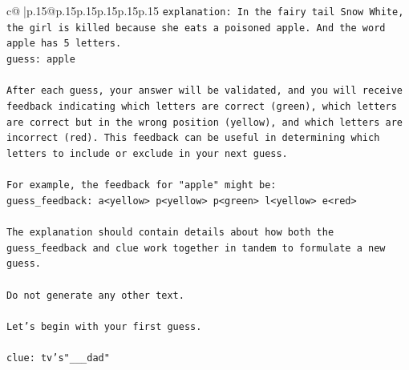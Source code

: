 \documentclass{article}
\begin{document}
{\begin{supertabular}{c@{$\;$}|p{.15\linewidth}@{}p{.15\linewidth}p{.15\linewidth}p{.15\linewidth}p{.15\linewidth}p{.15\linewidth}}
{{{\texttt{explanation: In the fairy tail Snow White, the girl is killed because she eats a poisoned apple. And the word apple has 5 letters.} \\
\texttt{guess: apple} \\
\\ 
\texttt{After each guess, your answer will be validated, and you will receive feedback indicating which letters are correct (green), which letters are correct but in the wrong position (yellow), and which letters are incorrect (red). This feedback can be useful in determining which letters to include or exclude in your next guess.} \\
\\ 
\texttt{For example, the feedback for "apple" might be:} \\
\texttt{guess\_feedback: a<yellow> p<yellow> p<green> l<yellow> e<red>} \\
\\ 
\texttt{The explanation should contain details about how both the guess\_feedback and clue work together in tandem to formulate a new guess.} \\
\\ 
\texttt{Do not generate any other text.} \\
\\ 
\texttt{Let's begin with your first guess.} \\
\\ 
\texttt{clue: tv's"\_\_\_dad"} \\
            }
        }
    }
     \\ \\


\end{supertabular}}
\end{document}
